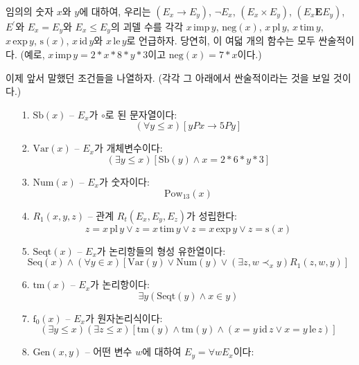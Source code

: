 \documentclass[12pt]{paper}
\begin{document}
임의의 숫자 $x$와 $y$에 대하여, 우리는 $\left( E_{x} \rightarrow E_{y} \right)$, $\lnot E_{x}$, $\left( E_{x} \times E_{y} \right)$, $\left( E_{x} \mathrm{\mathbf{E}} E_{y} \right)$, $E^{\prime}$와 $E_{x} = E_{y}$와 $E_{x} \le E_{y}$의 괴델 수를
각각 $x \, \mathrm{imp} \, y$, $\mathrm{neg} \left( x \right)$, $x \, \mathrm{pl} \, y$, $x \, \mathrm{tim} \, y$, $x \, \mathrm{exp} \, y$, $\mathrm{s} \left( x \right)$, $x \, \mathrm{id} \, y$와 $x \, \mathrm{le} \, y$로 언급하자.
당연히, 이 여덟 개의 함수는 모두 싼술적이다. (예로, $x \, \mathrm{imp} \, y = 2 * x * 8 * y * 3$이고 $\mathrm{neg} \left( x \right) = 7 * x$이다.)

이제 앞서 말했던 조건들을 나열하자. (각각 그 아래에서 싼술적이라는 것을 보일 것이다.)
\begin{enumerate}
\item[{1.}] $\mathrm{Sb} \left( x \right)$ -- $E_x$가 $\circ$로 된 문자열이다:
$$ \left( \forall y \le x \right) \left[ y P x \rightarrow 5 P y \right] $$
\item[{2.}] $\mathrm{Var} \left( x \right)$ -- $E_x$가 개체변수이다:
$$ \left( \exists y \le x \right) \left[ \mathrm{Sb} \left( y \right) \land x = 2 * 6 * y * 3 \right] $$
\item[{3.}] $\mathrm{Num} \left( x \right)$ -- $E_x$가 숫자이다:
$$ \mathrm{Pow}_{13}\left( x \right) $$
\item[{4.}] $R_1 \left( x , y , z \right)$ -- 관계 $R_t \left( E_x , E_y , E_z \right)$가 성립한다:
$$ z = x \, \mathrm{pl} \, y \lor z = x \, \mathrm{tim} \, y \lor z = x \, \mathrm{exp} \, y \lor z = \mathrm{s} \left( x \right)$$
\item[{5.}] $\mathrm{Seqt} \left( x \right)$ -- $E_{x}$가 논리항들의 형성 유한열이다:
$$ \mathrm{Seq} \left( x \right) \land \left( \forall y \in x \right) \left[ \mathrm{Var} \left( y \right) \lor \mathrm{Num} \left( y \right) \lor \left( \exists z , w \prec_x y \right) R_1 \left( z , w , y \right) \right] $$
\item[{6.}] $\mathrm{tm} \left( x \right)$ -- $E_{x}$가 논리항이다:
$$ \exists y \left( \mathrm{Seqt} \left( y \right) \land x \in y \right) $$
\item[{7.}] $\mathrm{f}_0 \left( x \right)$ -- $E_{x}$가 원자논리식이다:
$$ \left( \exists y \le x \right) \left( \exists z \le x \right) \left[ \mathrm{tm}\left( y \right) \land \mathrm{tm}\left( y \right) \land \left( x = y \, \mathrm{id} \, z \lor x = y \, \mathrm {le} \, z \right) \right] $$
\item[{8.}] $\mathrm{Gen} \left( x , y \right)$ -- 어떤 변수 $w$에 대하여 $E_y = \forall w E_x $이다:

\end{enumerate}
\end{document}

